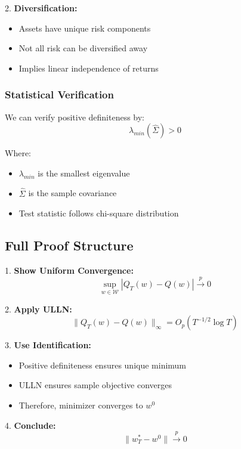\documentclass[12pt,article]{memoir}
\begin{document}
2. \textbf{Diversification:}
\begin{itemize}
    \item Assets have unique risk components
    \item Not all risk can be diversified away
    \item Implies linear independence of returns
\end{itemize}

\subsubsection{Statistical Verification}

We can verify positive definiteness by:
\begin{equation}
    \lambda_{min}(\hat{\Sigma}) > 0
\end{equation}

Where:
\begin{itemize}
    \item $\lambda_{min}$ is the smallest eigenvalue
    \item $\hat{\Sigma}$ is the sample covariance
    \item Test statistic follows chi-square distribution
\end{itemize}

\subsection{Full Proof Structure}

1. \textbf{Show Uniform Convergence:}
\begin{equation}
    \sup_{w \in \mathcal{W}} |Q_T(w) - Q(w)| \xrightarrow{p} 0
\end{equation}

2. \textbf{Apply ULLN:}
\begin{equation}
    \|Q_T(w) - Q(w)\|_{\infty} = O_p(T^{-1/2}\log T)
\end{equation}

3. \textbf{Use Identification:}
\begin{itemize}
    \item Positive definiteness ensures unique minimum
    \item ULLN ensures sample objective converges
    \item Therefore, minimizer converges to $w^0$
\end{itemize}

4. \textbf{Conclude:}
\begin{equation}
    \|w_T^* - w^0\| \xrightarrow{p} 0
\end{equation}
\end{document}

